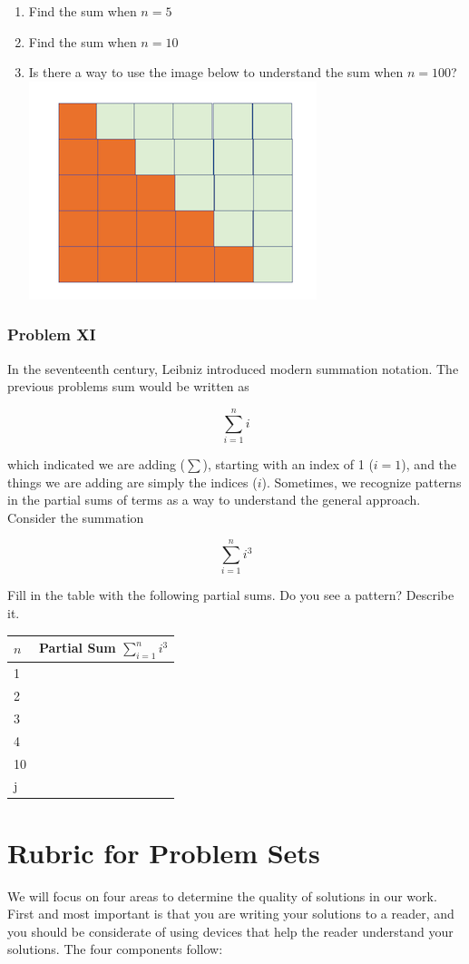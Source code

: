 \documentclass[11pt]{article}
\makeatletter
\def\maxwidth{\ifdim\Gin@nat@width>\linewidth\linewidth
    \else\Gin@nat@width\fi}
\let\Oldincludegraphics\includegraphics
\renewcommand{\includegraphics}[1]{\Oldincludegraphics[width=.8\maxwidth]{#1}}
\providecommand{\tightlist}{%
      \setlength{\itemsep}{0pt}\setlength{\parskip}{0pt}}
\makeatother
\begin{document}
\begin{enumerate}
\def\labelenumi{\arabic{enumi}.}
\tightlist
\item
  Find the sum when \(n = 5\)
\item
  Find the sum when \(n = 10\)
\item
  Is there a way to use the image below to understand the sum when
  \(n = 100\)? \includegraphics{images/section_I/p7.png}
\end{enumerate}

    \subsubsection{Problem XI}\label{problem-xi}

In the seventeenth century, Leibniz introduced modern summation
notation. The previous problems sum would be written as

\[\sum_{i = 1}^n i \]

which indicated we are adding (\(\sum\)), starting with an index of 1
(\(i = 1\)), and the things we are adding are simply the indices
(\(i\)). Sometimes, we recognize patterns in the partial sums of terms
as a way to understand the general approach. Consider the summation

\[\sum_{i = 1}^n i^3\]

Fill in the table with the following partial sums. Do you see a pattern?
Describe it.

\begin{longtable}[]{@{}ll@{}}
\toprule
\(n\) & Partial Sum \(\sum_{i = 1}^n i^3\)\tabularnewline
\midrule
\endhead
1 &\tabularnewline
2 &\tabularnewline
3 &\tabularnewline
4 &\tabularnewline
10 &\tabularnewline
j &\tabularnewline
\bottomrule
\end{longtable}

    \section{Rubric for Problem Sets}\label{rubric-for-problem-sets}
\label{sec:03-solutionsrubric}
    We will focus on four areas to determine the quality of solutions in our
work. First and most important is that you are writing your solutions to
a reader, and you should be considerate of using devices that help the
reader understand your solutions. The four components follow:
\end{document}
